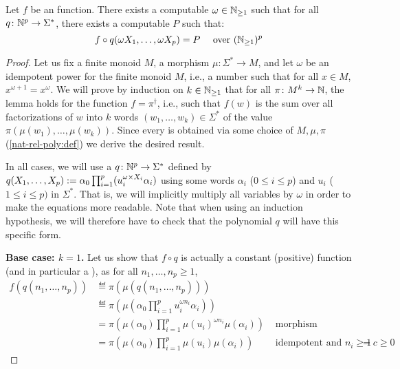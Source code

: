 \begin{lemma}
    \label{n-poly-combinatorics:lem}
    Let $f$ be an  function. 
    There exists a computable $\omega \in \mathbb{N}_{\geq 1}$
    such that for all 
    $q \colon \mathbb{N}^p \to \Sigma^*$,
    there exists a computable  $P$
    such that:
    \begin{equation*}
        f \circ q(\omega X_1, \dots, \omega X_p)
        =
        P
        \quad 
        \text{ over } (\mathbb{N}_{\geq 1})^p
    \end{equation*}
\end{lemma}
\begin{proof}
    Let us fix a finite monoid $M$, a morphism $\mu \colon \Sigma^* \to M$, and 
    let $\omega$ be an idempotent power for the finite monoid $M$,
    i.e., a number such that for all $x \in M$,
    $x^{\omega+1} = x^\omega$.
    We will prove by induction on $k \in \mathbb{N}_{\geq 1}$
    that for all
    $\pi \colon M^k \to \mathbb{N}$,
    the lemma holds for the function 
    $f = \pi^\dagger$, i.e., such that
    $f(w)$ is the sum over all factorizations of $w$
    into $k$ words $(w_1, \dots, w_k) \in \Sigma^*$
    of the value $\pi(\mu(w_1), \dots, \mu(w_k))$.
    Since every 
    is obtained via some choice of $M, \mu, \pi$ (\cref{nat-rel-poly:def})
    we derive the desired result.

    In all cases, we will use a  $q \colon \mathbb{N}^p \to
    \Sigma^*$ defined by $q(X_1, \dots, X_p) \mathrel{:=} \alpha_0 \prod_{i = 1}^p
    (u_i^{\omega \times X_i} \alpha_i)$ using some words $\alpha_i$ ($0 \leq i
    \leq p$) and $u_i$ ($1 \leq i \leq p)$ in $\Sigma^*$. That is, we will
    implicitly multiply all variables by $\omega$ in order to make the
    equations more readable. Note that when using an induction hypothesis, we
    will therefore have to check that the polynomial $q$ will have this
    specific form.

    \textbf{Base case: $k = 1$.}
    Let us show that $f \circ q$ is
    actually a constant (positive) function (and in particular a ), as for
    all $n_1, \dots, n_p \geq 1$,
    \begin{align*}
        f(q(n_1, \dots, n_p))
        &\eqdef \pi\left(\mu(q(n_1, \dots, n_p))\right) \\
        &\eqdef \pi\left(\mu(\alpha_0 \prod_{i = 1}^p u_i^{\omega n_i} \alpha_i)\right)
        \\
        &= \pi\left(\mu(\alpha_0) \prod_{i = 1}^p \mu(u_i)^{\omega n_i} \mu(\alpha_i)\right) 
        & \text{ morphism }
        \\
        &= \pi\left(\mu(\alpha_0) \prod_{i = 1}^p \mu(u_i) \mu(\alpha_i)\right)
        & \text{ idempotent and } n_i \geq 1
        &= c \geq 0
    \end{align*}


\end{proof}
